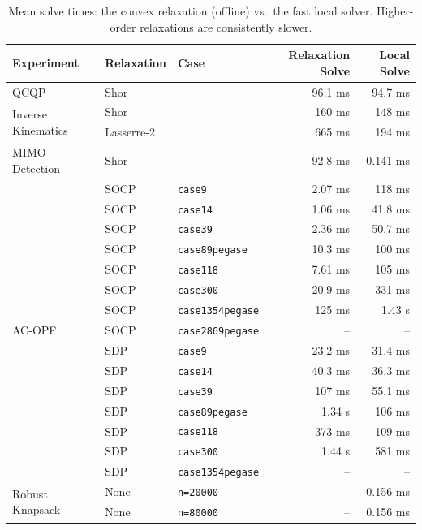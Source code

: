 \documentclass[10pt]{article} %
\theoremstyle{plain}
\theoremstyle{definition}
\theoremstyle{remark}
\begin{document}
\begin{table}[t]
\centering\footnotesize
\caption{Mean solve times: the convex relaxation (offline) vs.\ the fast local solver.
Higher-order relaxations are consistently slower.}
\label{tab:timing}
\begin{tabular}{lll rr}
\toprule
\textbf{Experiment} & \textbf{Relaxation} & \textbf{Case} &
Relaxation Solve & Local Solve \\
\midrule
  \multirow{1}{*}{QCQP} & Shor &  & 96.1 ms & 94.7 ms \\
\midrule
  \multirow{2}{*}{Inverse Kinematics} & Shor &  & 160 ms & 148 ms \\
   & Lasserre-2 &  & 665 ms & 194 ms \\
\midrule
  \multirow{1}{*}{MIMO Detection} & Shor &  & 92.8 ms & 0.141 ms \\
\midrule
  \multirow{15}{*}{AC-OPF} & SOCP & \texttt{case9} & 2.07 ms & 118 ms \\
   & SOCP & \texttt{case14} & 1.06 ms & 41.8 ms \\
   & SOCP & \texttt{case39} & 2.36 ms & 50.7 ms \\
   & SOCP & \texttt{case89pegase} & 10.3 ms & 100 ms \\
   & SOCP & \texttt{case118} & 7.61 ms & 105 ms \\
   & SOCP & \texttt{case300} & 20.9 ms & 331 ms \\
   & SOCP & \texttt{case1354pegase} & 125 ms & 1.43 s \\
   & SOCP & \texttt{case2869pegase} & -- & -- \\
   & SDP & \texttt{case9} & 23.2 ms & 31.4 ms \\
   & SDP & \texttt{case14} & 40.3 ms & 36.3 ms \\
   & SDP & \texttt{case39} & 107 ms & 55.1 ms \\
   & SDP & \texttt{case89pegase} & 1.34 s & 106 ms \\
   & SDP & \texttt{case118} & 373 ms & 109 ms \\
   & SDP & \texttt{case300} & 1.44 s & 581 ms \\
   & SDP & \texttt{case1354pegase} & -- & -- \\
\midrule
  \multirow{2}{*}{Robust Knapsack} & None & \texttt{n=20000} & -- & 0.156 ms \\
   & None & \texttt{n=80000} & -- & 0.156 ms \\
\bottomrule
\end{tabular}
\end{table}
\end{document}
